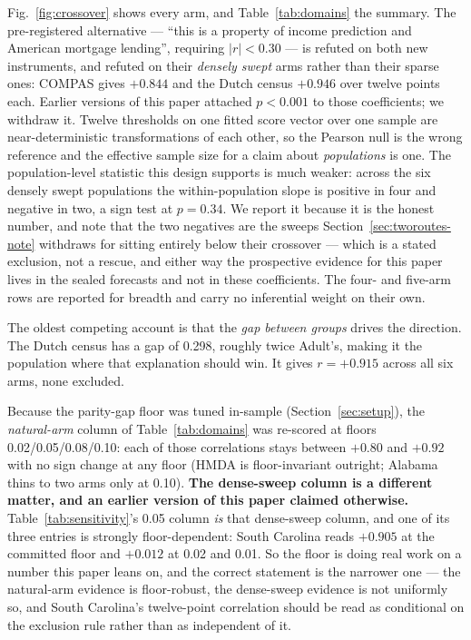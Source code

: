 \documentclass[conference]{IEEEtran}
\begin{document}
Fig.~\ref{fig:crossover} shows every arm, and Table~\ref{tab:domains} the summary. The
pre-registered alternative --- ``this is a property of income prediction and American mortgage
lending'', requiring $|r| < 0.30$ --- is refuted on both new instruments, and refuted on their \emph{densely swept} arms rather than their sparse ones: COMPAS gives
$+0.844$ and the Dutch census $+0.946$ over twelve points each. Earlier versions of this paper
attached $p < 0.001$ to those coefficients; we withdraw it. Twelve thresholds on one fitted
score vector over one sample are near-deterministic transformations of each other, so the
Pearson null is the wrong reference and the effective sample size for a claim about
\emph{populations} is one. The population-level statistic this design supports is much
weaker: across the six densely swept populations the within-population slope is positive in
four and negative in two, a sign test at $p = 0.34$. We report it because it is the honest
number, and note that the two negatives are the sweeps Section~\ref{sec:tworoutes-note}
withdraws for sitting entirely below their crossover --- which is a stated exclusion, not a
rescue, and either way the prospective evidence for this paper lives in the sealed forecasts
and not in these coefficients. The four- and five-arm rows are reported for breadth and carry
no inferential weight on their own.

The oldest competing account is that the \emph{gap between groups} drives the direction. The
Dutch census has a gap of 0.298, roughly twice Adult's, making it the population where that
explanation should win. It gives $r = +0.915$ across all six arms, none excluded.

Because the parity-gap floor was tuned in-sample (Section~\ref{sec:setup}), the
\emph{natural-arm} column of Table~\ref{tab:domains} was re-scored at floors
0.02/0.05/0.08/0.10: each of those correlations stays between $+0.80$ and $+0.92$ with no sign
change at any floor (HMDA is floor-invariant outright; Alabama thins to two arms only at
0.10). \textbf{The dense-sweep column is a different matter, and an earlier version of this
paper claimed otherwise.} Table~\ref{tab:sensitivity}'s 0.05 column \emph{is} that dense-sweep
column, and one of its three entries is strongly floor-dependent: South Carolina reads
$+0.905$ at the committed floor and $+0.012$ at 0.02 and 0.01. So the floor is doing real work
on a number this paper leans on, and the correct statement is the narrower one --- the
natural-arm evidence is floor-robust, the dense-sweep evidence is not uniformly so, and South
Carolina's twelve-point correlation should be read as conditional on the exclusion rule rather
than as independent of it.
\end{document}
